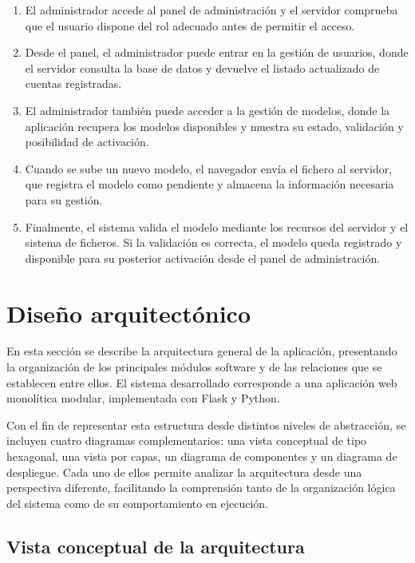 \begin{enumerate}
	\item El administrador accede al panel de administración y el servidor comprueba que el usuario dispone del rol adecuado antes de permitir el acceso.
	
	\item Desde el panel, el administrador puede entrar en la gestión de usuarios, donde el servidor consulta la base de datos y devuelve el listado actualizado de cuentas registradas.
	
	\item El administrador también puede acceder a la gestión de modelos, donde la aplicación recupera los modelos disponibles y muestra su estado, validación y posibilidad de activación.
	
	\item Cuando se sube un nuevo modelo, el navegador envía el fichero al servidor, que registra el modelo como pendiente y almacena la información necesaria para su gestión.
	
	\item Finalmente, el sistema valida el modelo mediante los recursos del servidor y el sistema de ficheros. Si la validación es correcta, el modelo queda registrado y disponible para su posterior activación desde el panel de administración.
\end{enumerate}

\section{Diseño arquitectónico}

En esta sección se describe la arquitectura general de la aplicación, presentando la organización de los principales módulos software y de las relaciones que se establecen entre ellos. El sistema desarrollado corresponde a una aplicación web monolítica modular, implementada con Flask y Python.

Con el fin de representar esta estructura desde distintos niveles de abstracción, se incluyen cuatro diagramas complementarios: una vista conceptual de tipo hexagonal, una vista por capas, un diagrama de componentes y un diagrama de despliegue. Cada uno de ellos permite analizar la arquitectura desde una perspectiva diferente, facilitando la comprensión tanto de la organización lógica del sistema como de su comportamiento en ejecución.

\subsection{Vista conceptual de la arquitectura}

